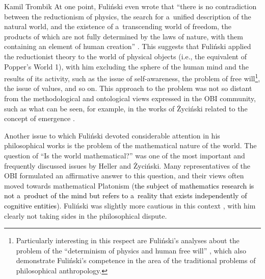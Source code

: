 \begin{artengenv}{Kamil Trombik}
At one point, Fuliński even wrote that ``there is no contradiction between the reductionism of physics, the search for a~unified description of the natural world, and the existence of a~transcending world of freedom, the products of which are not fully determined by the laws of nature, with them containing an element of human creation''
\parencite[][p.47]{fulinski_o_1993}. %
 This suggests that Fuliński applied the reductionist theory to the world of physical objects (i.e., the equivalent of Popper's World 1), with him excluding the sphere of the human mind and the results of its activity, such as the issue of self-awareness, the problem of free will\footnote{Particularly interesting in this respect are Fuliński's analyses about the problem of the ``determinism of physics and human free will'' 
\parencites[see e.g][]{janik_fizyka_1998}[][]{wojtowicz_determinizm_2005}, %
 which also demonstrate Fuliński's competence in the area of the traditional problems of philosophical anthropology.}, the issue of values, and so on. This approach to the problem was not so distant from the methodological and ontological views expressed in the OBI community, such as what can be seen, for example, in the works of Życiński related to the concept of emergence 
\parencite[e.g][]{zycinski_wszechswiat_2009}.%




Another issue to which Fuliński devoted considerable attention in his philosophical works is the problem of the mathematical nature of the world. The question of ``Is the world mathematical?'' was one of the most important and frequently discussed issues by Heller and Życiński. Many representatives of the OBI formulated an affirmative answer to this question, and their views often moved towards mathematical Platonism (\textcolor{black}{the subject of mathematics research is not a~product of the mind but refers to a~reality that exists independently of cognitive entities}). Fuliński was slightly more cautious in this context 
\parencite[e.g][]{janik_glos_1990}, %
 with him clearly not taking sides in the philosophical dispute.




\end{artengenv}

